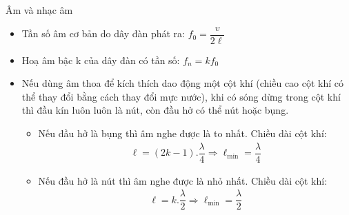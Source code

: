 \begin{dang}{Âm và nhạc âm}
\begin{itemize}
\item Tần số âm cơ bản do dây đàn phát ra: $f_0=\dfrac{v}{2\ell}$
\item Hoạ âm bậc k của dây đàn có tần số: $f_n=kf_0$
\end{itemize}
\begin{itemize}
\item Nếu dùng âm thoa để kích thích dao động một cột khí (chiều
cao cột khí có thể thay đổi bằng cách thay đổi mực nước), khi có sóng dừng trong cột khí thì đầu kín luôn luôn là nút, còn đầu hở có thể nút
hoặc bụng.
\begin{itemize}
\item Nếu đầu hở là bụng thì âm nghe được là to nhất. Chiều dài cột khí:  
\begin{align*}
\ell=\left(2k-1\right).\dfrac{\lambda}{4}
\Rightarrow \ell_{\min}=\dfrac{\lambda}{4}
\end{align*}
\item Nếu đầu hở là nút thì âm nghe được là nhỏ nhất. Chiều dài cột khí: 
\begin{align*}
\ell=k.\dfrac{\lambda}{2}\Rightarrow \ell_{\min}=\dfrac{\lambda}{2}
\end{align*}
\end{itemize}
\end{itemize}
\end{dang}